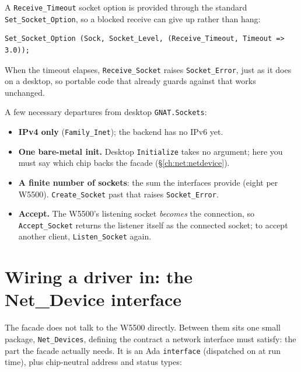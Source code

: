 A \texttt{Receive\_Timeout} socket option is provided through the standard
\texttt{Set\_Socket\_Option}, so a blocked receive can give up rather than hang:

\begin{lstlisting}
Set_Socket_Option (Sock, Socket_Level, (Receive_Timeout, Timeout => 3.0));
\end{lstlisting}

When the timeout elapses, \texttt{Receive\_Socket} raises \texttt{Socket\_Error},
just as it does on a desktop, so portable code that already guards against that
works unchanged.

A few necessary departures from desktop \texttt{GNAT.Sockets}:

\begin{itemize}[nosep]
\item \textbf{IPv4 only} (\texttt{Family\_Inet}); the backend has no IPv6 yet.
\item \textbf{One bare-metal init.} Desktop \texttt{Initialize} takes no argument;
here you must say which chip backs the facade (\S\ref{ch:net:netdevice}).
\item \textbf{A finite number of sockets}: the sum the interfaces provide (eight
per W5500). \texttt{Create\_Socket} past that raises \texttt{Socket\_Error}.
\item \textbf{Accept.} The W5500's listening socket \emph{becomes} the connection,
so \texttt{Accept\_Socket} returns the listener itself as the connected socket; to
accept another client, \texttt{Listen\_Socket} again.
\end{itemize}

\section{Wiring a driver in: the Net\_Device interface}
\label{ch:net:netdevice}

The facade does not talk to the W5500 directly. Between them sits one small
package, \texttt{Net\_Devices}, defining the contract a network interface must
satisfy: the part the facade actually needs. It is an Ada \texttt{interface}
(dispatched on at run time), plus chip-neutral address and status types:

